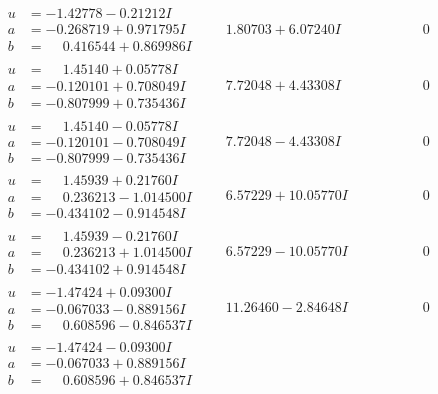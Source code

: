 \documentclass[1p]{elsarticle_modified}
\theoremstyle{definition}
\begin{document}
$$\begin{array}{c|c|c}
 \hline 
\begin{aligned}
u &= -1.42778 - 0.21212 I \\
a &= -0.268719 + 0.971795 I \\
b &= \phantom{-}0.416544 + 0.869986 I\end{aligned}
 & \phantom{-}1.80703 + 6.07240 I & \phantom{-0.000000 } 0 \\ \hline\begin{aligned}
u &= \phantom{-}1.45140 + 0.05778 I \\
a &= -0.120101 + 0.708049 I \\
b &= -0.807999 + 0.735436 I\end{aligned}
 & \phantom{-}7.72048 + 4.43308 I & \phantom{-0.000000 } 0 \\ \hline\begin{aligned}
u &= \phantom{-}1.45140 - 0.05778 I \\
a &= -0.120101 - 0.708049 I \\
b &= -0.807999 - 0.735436 I\end{aligned}
 & \phantom{-}7.72048 - 4.43308 I & \phantom{-0.000000 } 0 \\ \hline\begin{aligned}
u &= \phantom{-}1.45939 + 0.21760 I \\
a &= \phantom{-}0.236213 - 1.014500 I \\
b &= -0.434102 - 0.914548 I\end{aligned}
 & \phantom{-}6.57229 + 10.05770 I & \phantom{-0.000000 } 0 \\ \hline\begin{aligned}
u &= \phantom{-}1.45939 - 0.21760 I \\
a &= \phantom{-}0.236213 + 1.014500 I \\
b &= -0.434102 + 0.914548 I\end{aligned}
 & \phantom{-}6.57229 - 10.05770 I & \phantom{-0.000000 } 0 \\ \hline\begin{aligned}
u &= -1.47424 + 0.09300 I \\
a &= -0.067033 - 0.889156 I \\
b &= \phantom{-}0.608596 - 0.846537 I\end{aligned}
 & \phantom{-}11.26460 - 2.84648 I & \phantom{-0.000000 } 0 \\ \hline\begin{aligned}
u &= -1.47424 - 0.09300 I \\
a &= -0.067033 + 0.889156 I \\
b &= \phantom{-}0.608596 + 0.846537 I\end{aligned}

\end{array}$$
\end{document}
